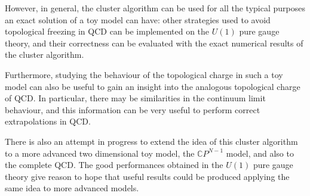 However, in general, the cluster algorithm can be used for all the typical purposes an exact solution of a toy model can have:
other strategies used to avoid topological freezing in QCD can be implemented on the $U(1)$ pure gauge theory,
and their correctness can be evaluated with the exact numerical results of the cluster algorithm.

Furthermore, studying the behaviour of the topological charge in such a toy model can also be useful to gain an insight into the analogous topological charge of QCD.
In particular, there may be similarities in the continuum limit behaviour, and this information can be very useful to perform correct extrapolations in QCD.

There is also an attempt in progress to extend the idea of this cluster algorithm to a more advanced two dimensional toy model,
the $\mathbb CP^{N-1}$ model, and also to the complete QCD.
The good performances obtained in the $U(1)$ pure gauge theory give reason to hope that useful results could be produced applying the same idea to more advanced models.

